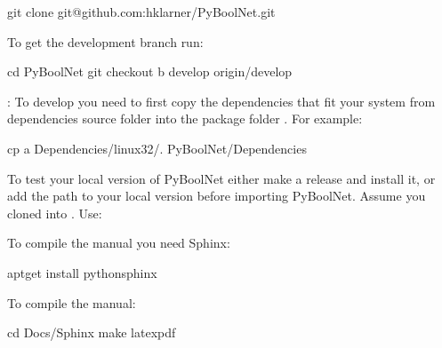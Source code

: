 \documentclass[letterpaper,10pt,english]{sphinxmanual}
\begin{document}
\begin{sphinxVerbatim}[commandchars=\\\{\}]
\PYGZdl{} git clone git@github.com:hklarner/PyBoolNet.git
\end{sphinxVerbatim}

To get the development branch run:

\begin{sphinxVerbatim}[commandchars=\\\{\}]
\PYGZdl{} cd PyBoolNet
\PYGZdl{} git checkout \PYGZhy{}b develop origin/develop
\end{sphinxVerbatim}

:
To develop you need to first copy the dependencies that fit your system from dependencies source folder  into the package folder .
For example:

\begin{sphinxVerbatim}[commandchars=\\\{\}]
\PYGZdl{} cp \PYGZhy{}a Dependencies/linux32/. PyBoolNet/Dependencies
\end{sphinxVerbatim}

To test your local version of PyBoolNet either make a release and install it,
or add the path to your local version before importing PyBoolNet.
Assume you cloned into .
Use:

\begin{sphinxVerbatim}[commandchars=\\\{\}]
 
 
\end{sphinxVerbatim}

To compile the manual you need Sphinx:

\begin{sphinxVerbatim}[commandchars=\\\{\}]
\PYGZdl{} apt\PYGZhy{}get install python\PYGZhy{}sphinx
\end{sphinxVerbatim}

To compile the manual:

\begin{sphinxVerbatim}[commandchars=\\\{\}]
\PYGZdl{} cd Docs/Sphinx
\PYGZdl{} make latexpdf
\end{sphinxVerbatim}
\end{document}
